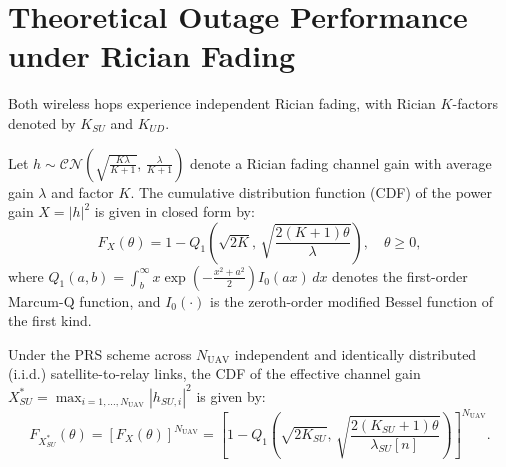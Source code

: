 \section{Theoretical Outage Performance under Rician Fading}
\label{sec:performance_analysis}

Both wireless hops experience independent Rician fading, with Rician $K$-factors denoted by $K_{SU}$ and $K_{UD}$.

\begin{lemma}
Let $h \sim \mathcal{CN}(\sqrt{\frac{K\lambda}{K+1}}, \, \frac{\lambda}{K+1})$ denote a Rician fading channel gain with average gain $\lambda$ and factor $K$. The cumulative distribution function (CDF) of the power gain $X = |h|^2$ is given in closed form by:
\begin{equation}
    F_X(\theta) = 1 - Q_1\left( \sqrt{2K}, \, \sqrt{\frac{2(K+1)\theta}{\lambda}} \right), \quad \theta \ge 0,
    \label{eq:rician_cdf}
\end{equation}
where $Q_1(a, b) = \int_b^\infty x \exp\left( -\frac{x^2 + a^2}{2} \right) I_0(ax) \, dx$ denotes the first-order Marcum-Q function, and $I_0(\cdot)$ is the zeroth-order modified Bessel function of the first kind.
\end{lemma}

\begin{lemma}
Under the PRS scheme across $N_{\text{UAV}}$ independent and identically distributed (i.i.d.) satellite-to-relay links, the CDF of the effective channel gain $X_{SU}^* = \max_{i=1,\dots,N_{\text{UAV}}} |h_{SU, i}|^2$ is given by:
\begin{equation}
    F_{X_{SU}^*}(\theta) = \left[ F_X(\theta) \right]^{N_{\text{UAV}}} = \left[ 1 - Q_1\left( \sqrt{2K_{SU}}, \, \sqrt{\frac{2(K_{SU}+1)\theta}{\lambda_{SU}[n]}} \right) \right]^{N_{\text{UAV}}}.
    \label{eq:prs_cdf}
\end{equation}
\end{lemma}


